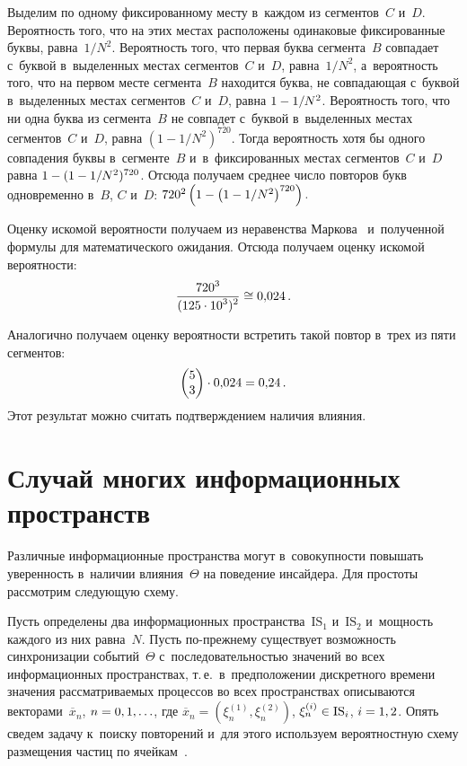 \begin{multicols}{2}
  Выделим по одному фиксированному месту в~каждом из сегментов~$C$ и~$D$. 
Вероятность того, что на этих местах расположены одинаковые фиксированные 
буквы, равна~$1/N^2$. Вероятность того, что первая бук\-ва сегмента~$B$ совпадает 
с~бук\-вой в~выделенных местах сегментов~$C$ и~$D$, равна~$1/N^2$, а~вероятность 
того, что на первом месте сегмента~$B$ находится бук\-ва, не совпадающая с~бук\-вой 
в~выделенных местах сегментов~$C$ и~$D$, равна $1\hm- 1/N^2$. Вероятность того, 
что ни одна бук\-ва из сегмента~$B$ не совпадет с~буквой в~выделенных местах 
сегментов~$C$ и~$D$, равна $(1-1/N^2)^{720}$. Тогда вероятность хотя бы одного 
совпадения бук\-вы в~сегменте~$B$ и~в~фиксированных местах сегментов~$C$ и~$D$ 
равна $1\hm- (1\hm- 1/N^2)^{720}$. 
  Отсюда получаем среднее число повторов букв одновременно в~$B$, $C$ и~$D$:
  $720^2\left( 1\hm-\left( 1-{1}/{N^2}\right)^{720}\right).$
  
  Оценку искомой вероятности получаем из неравенства Маркова~\cite{14-gr} 
и~полученной формулы для математического ожидания. Отсюда получаем оценку 
искомой вероятности:
$$
\displaystyle\frac{\displaystyle 720^3\mathstrut}{\displaystyle (125\cdot 10^3)^2\mathstrut}\cong 0{,}024\,.
$$
  
  Аналогично получаем оценку вероятности встретить такой повтор в~трех из пяти 
сегментов:
$$
\left( \begin{matrix} 5\\ 3\end{matrix}\right)\cdot 0{,}024\hm= 0{,}24\,.
$$
 Этот 
результат можно считать подтверждением наличия влияния. 
  
  \section{Случай многих информационных пространств}
  
  Различные информационные пространства могут в~совокупности повышать 
уверенность в~наличии влияния~$\Theta$ на поведение инсайдера. Для простоты 
рассмотрим следующую схему.
  
  Пусть определены два информационных пространства~$\mathrm{IS}_1$ и~$\mathrm{IS}_2$ 
и~мощность каждого из них равна~$N$. Пусть по-прежнему существует 
возможность синхронизации событий~$\Theta$ с~последовательностью значений 
во всех информационных пространствах, т.\,е.\ в~предположении дискретного 
времени значения рассматриваемых процессов во всех пространствах 
описываются векторами~$\overline{x}_n$, $n \hm= 0, 1,\ldots$, где 
$\overline{x}_n=\left( \xi_n^{(1)}, \xi_n^{(2)}\right)$, $\xi_n^{(i)}\hm\in \mathrm{IS}_i$, 
$i\hm = 1, 2$. Опять сведем задачу к~поиску повторений и~для этого используем 
вероятностную схему размещения частиц по ячейкам~\cite{13-gr}. 
  

\end{multicols}
